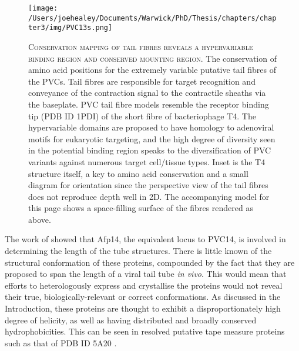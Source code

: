 \begin{landscape}
\begin{figure}[p]
 \centering
   \texttt{[image: /Users/joehealey/Documents/Warwick/PhD/Thesis/chapters/chapter3/img/PVC13s.png]}
 \captionsetup{singlelinecheck=off, justification=justified, font=footnotesize, aboveskip=10pt}
 \caption[Conservation mapping off putative tail fibre structures]{\textsc{\normalsize Conservation mapping of tail fibres reveals a hypervariable binding region and conserved mounting region.}\vspace{0.1cm} \newline The conservation of amino acid positions for the extremely variable putative tail fibres of the PVCs. Tail fibres are responsible for target recognition and conveyance of the contraction signal to the contractile sheaths via the baseplate. PVC tail fibre models resemble the receptor binding tip (PDB ID 1PDI) of the short fibre of bacteriophage T4. The hypervariable domains are proposed to have homology to adenoviral motifs for eukaryotic targeting, and the high degree of diversity seen in the potential binding region speaks to the diversification of PVC variants against numerous target cell/tissue types. Inset is the T4 structure itself, a key to amino acid conservation and a small diagram for orientation since the perspective view of the tail fibres does not reproduce depth well in 2D. The accompanying model for this page shows a space-filling surface of the fibres rendered as above. }
 \label{fibre_models}
\end{figure}
\end{landscape}


The work of \cite{Rybakova2015} showed that Afp14, the equivalent locus to PVC14, is involved in determining the length of the tube structures. There is little known of the structural conformation of these proteins, compounded by the fact that they are proposed to span the length of a viral tail tube \emph{in vivo}. This would mean that efforts to heterologously express and crystallise the proteins would not reveal their true, biologically-relevant or correct conformations. As discussed in the Introduction, these proteins are thought to exhibit a disproportionately high degree of helicity, as well as having distributed and broadly conserved hydrophobicities. This can be seen in resolved putative tape measure proteins such as that of PDB ID 5A20 \citep{Chaban2015}.

